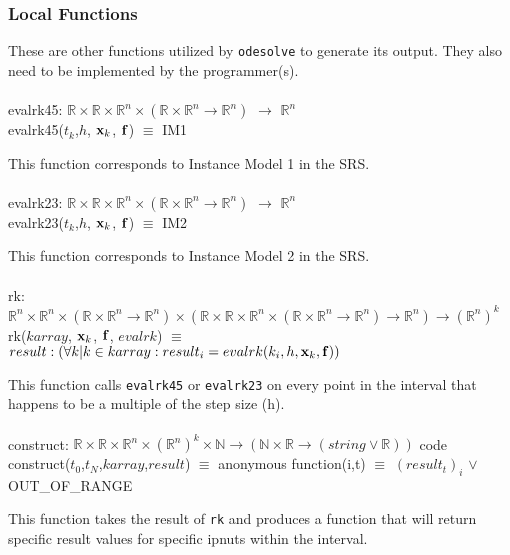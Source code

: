 \documentclass[12pt, titlepage]{article}
\begin{document}
\subsubsection{Local Functions}
These are other functions utilized by \lstinline[language=ML]|odesolve| to 
generate its output. They also need to be implemented by the programmer(s).\\
\\
evalrk45: $\mathbb{R} \times \mathbb{R} \times \mathbb{R}^n \times (\mathbb{R} 
\times \mathbb{R}^n \rightarrow \mathbb{R}^n)$ $\rightarrow$ $\mathbb{R}^n$\\
evalrk45($t_k$,$h$, ${\bf x}_k$, ${\bf f}$) $\equiv$ IM1

This function corresponds to Instance Model 1 in the SRS.\\
\\
evalrk23: $\mathbb{R} \times \mathbb{R} \times \mathbb{R}^n \times (\mathbb{R} 
\times \mathbb{R}^n \rightarrow \mathbb{R}^n)$ $\rightarrow$ $\mathbb{R}^n$\\
evalrk23($t_k$,$h$, ${\bf x}_k$, ${\bf f}$) $\equiv$ IM2

This function corresponds to Instance Model 2 in the SRS.\\
\\
rk: $\mathbb{R}^n \times \mathbb{R}^n \times 
(\mathbb{R} \times \mathbb{R}^n \rightarrow \mathbb{R}^n) \times
(\mathbb{R} \times \mathbb{R} \times \mathbb{R}^n \times (\mathbb{R} 
\times \mathbb{R}^n \rightarrow \mathbb{R}^n) \rightarrow \mathbb{R}^n) 
\rightarrow (\mathbb{R}^n)^k$\\
rk($karray$, ${\bf x}_k$, ${\bf f}$, $evalrk$) $\equiv$ $result : (\forall k | 
k 
\in karray : result_i = evalrk (k_i,h, {\bf x}_k, {\bf f}))$

This function calls \lstinline[language=ML]|evalrk45| or 
\lstinline[language=ML]|evalrk23| on every point in the interval that happens 
to be a multiple of the step size (h).\\
\\
construct: $\mathbb{R} \times \mathbb{R} \times \mathbb{R}^n \times 
(\mathbb{R}^n)^k \times \mathbb{N} \rightarrow (\mathbb{N} \times \mathbb{R} 
\rightarrow (string \lor \mathbb{R}))$ code\\
construct($t_0$,$t_N$,$karray$,$result$) $\equiv$ anonymous function(i,t) 
$\equiv$ $(result_t)_i$ $\lor$ OUT\_OF\_RANGE

This function takes the result of \lstinline[language=ML]|rk| and produces a 
function that will return specific result values for specific ipnuts within the 
interval.\\
\end{document}
